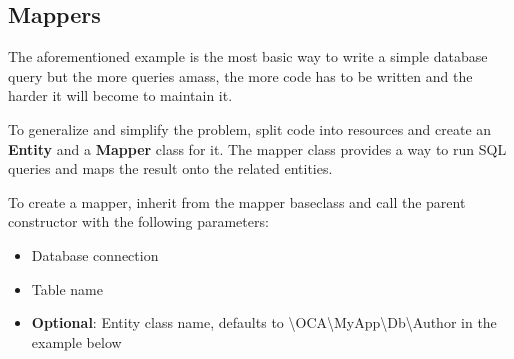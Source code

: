 \documentclass[letterpaper,10pt,english]{sphinxmanual}
\begin{document}
\subsection{Mappers}
\label{app/database:mappers}
The aforementioned example is the most basic way to write a simple database query but the more queries amass, the more code has to be written and the harder it will become to maintain it.

To generalize and simplify the problem, split code into resources and create an \textbf{Entity} and a \textbf{Mapper} class for it. The mapper class provides a way to run SQL queries and maps the result onto the related entities.

To create a mapper, inherit from the mapper baseclass and call the parent constructor with the following parameters:
\begin{itemize}
\item {} 
Database connection

\item {} 
Table name

\item {} 
\textbf{Optional}: Entity class name, defaults to \textbackslash{}OCA\textbackslash{}MyApp\textbackslash{}Db\textbackslash{}Author in the example below

\end{itemize}
\end{document}
